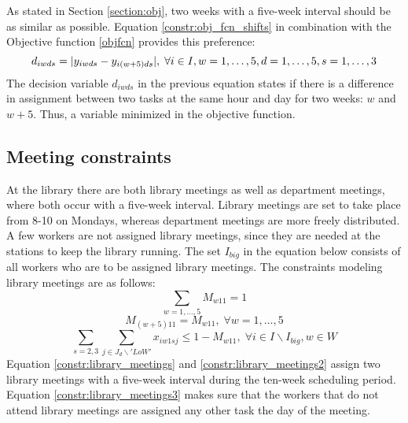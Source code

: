 As stated in Section \ref{section:obj}, two weeks with a five-week interval should be as similar as possible. Equation \ref{constr:obj_fcn_shifts} in combination with the Objective function \ref{objfcn} provides this preference:
\begin{equation} \label{constr:obj_fcn_shifts}
d_{iwds} = \lvert y_{iwds} - y_{i(w+5)ds}\rvert, \; \forall i \in I, w = 1,\ldots,5, d = 1, \ldots, 5, s = 1,\ldots,3
\end{equation}
The decision variable $d_{iwds}$ in the previous equation states if there is a difference in assignment between two tasks at the same hour and day for two weeks: $w$ and $w+5$. Thus, a variable minimized in the objective function.
\subsection{Meeting constraints} \label{section:meeting_constraints}
%
%
%
At the library there are both library meetings as well as department meetings, where both occur with a five-week interval. Library meetings are set to take place from 8-10 on Mondays, whereas department meetings are more freely distributed. A few workers are not assigned library meetings, since they are needed at the stations to keep the library running. The set $I_{big}$ in the equation below consists of all workers who are to be assigned library meetings. The constraints modeling library meetings are as follows:
\begin{equation} \label{constr:library_meetings}
\sum_{w = 1, \ldots, 5} M_{w11} = 1
\end{equation}
\begin{equation} \label{constr:library_meetings2}
M_{(w+5)11} = M_{w11}, \; \forall w = 1, \ldots, 5
\end{equation}
\begin{equation} \label{constr:library_meetings3}
\sum_{s = 2,3} \sum_{j \in J_d \backslash 'LoW'} x_{iw1sj} \leq 1-M_{w11}, \; \forall i \in I \backslash I_{big}, w \in W
\end{equation}
Equation \ref{constr:library_meetings} and \ref{constr:library_meetings2} assign two library meetings with a five-week interval during the ten-week scheduling period. Equation \ref{constr:library_meetings3} makes sure that the workers that do not attend library meetings are assigned any other task the day of the meeting.

